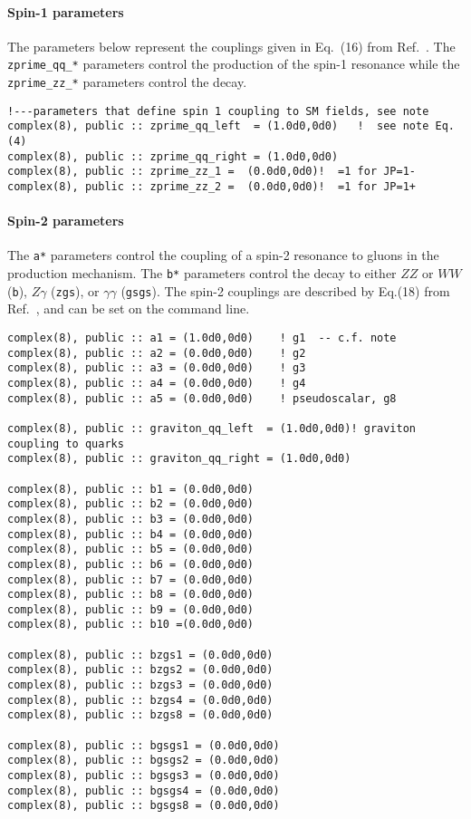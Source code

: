 \documentclass[aps,superscriptaddress,nofootinbib]{revtex4}
\begin{document}
\paragraph{Spin-1 parameters}
\label{spin1}

The parameters below represent the couplings given in Eq.~(16) from Ref.~\cite{Bolognesi:2012}. The \verb|zprime_qq_*| parameters control the production of the spin-1 resonance while the \verb|zprime_zz_*| parameters control the decay.

\begin{verbatim}
!---parameters that define spin 1 coupling to SM fields, see note
complex(8), public :: zprime_qq_left  = (1.0d0,0d0)   !  see note Eq. (4)
complex(8), public :: zprime_qq_right = (1.0d0,0d0)
complex(8), public :: zprime_zz_1 =  (0.0d0,0d0)!  =1 for JP=1-
complex(8), public :: zprime_zz_2 =  (0.0d0,0d0)!  =1 for JP=1+
\end{verbatim}

\paragraph{Spin-2 parameters}
\label{spin2}

\noindent
The \verb|a*| parameters control the coupling of a spin-2 resonance to gluons in the production mechanism.  The \verb|b*| parameters control the decay to either $ZZ$ or $WW$ (\verb|b|), $Z\gamma$ (\verb|zgs|), or $\gamma\gamma$ (\verb|gsgs|).
The spin-2 couplings are described by Eq.(18) from Ref.~\cite{Bolognesi:2012}, and can be set on the command line.

\begin{verbatim}
complex(8), public :: a1 = (1.0d0,0d0)    ! g1  -- c.f. note
complex(8), public :: a2 = (0.0d0,0d0)    ! g2
complex(8), public :: a3 = (0.0d0,0d0)    ! g3
complex(8), public :: a4 = (0.0d0,0d0)    ! g4
complex(8), public :: a5 = (0.0d0,0d0)    ! pseudoscalar, g8

complex(8), public :: graviton_qq_left  = (1.0d0,0d0)! graviton coupling to quarks
complex(8), public :: graviton_qq_right = (1.0d0,0d0)

complex(8), public :: b1 = (0.0d0,0d0)
complex(8), public :: b2 = (0.0d0,0d0)
complex(8), public :: b3 = (0.0d0,0d0)
complex(8), public :: b4 = (0.0d0,0d0)
complex(8), public :: b5 = (0.0d0,0d0)
complex(8), public :: b6 = (0.0d0,0d0)
complex(8), public :: b7 = (0.0d0,0d0)
complex(8), public :: b8 = (0.0d0,0d0)
complex(8), public :: b9 = (0.0d0,0d0)
complex(8), public :: b10 =(0.0d0,0d0)

complex(8), public :: bzgs1 = (0.0d0,0d0)
complex(8), public :: bzgs2 = (0.0d0,0d0)
complex(8), public :: bzgs3 = (0.0d0,0d0)
complex(8), public :: bzgs4 = (0.0d0,0d0)
complex(8), public :: bzgs8 = (0.0d0,0d0)

complex(8), public :: bgsgs1 = (0.0d0,0d0)
complex(8), public :: bgsgs2 = (0.0d0,0d0)
complex(8), public :: bgsgs3 = (0.0d0,0d0)
complex(8), public :: bgsgs4 = (0.0d0,0d0)
complex(8), public :: bgsgs8 = (0.0d0,0d0)
\end{verbatim}
\end{document}
